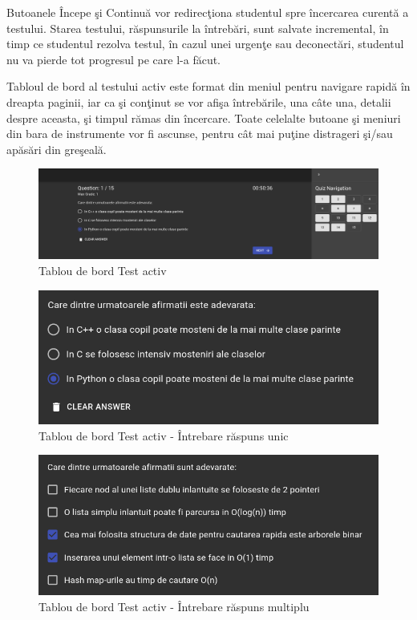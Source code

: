 \documentclass[12pt, a4paper, oneside, romanian]{teza-upb}
\begin{document}
Butoanele Începe şi Continuă vor redirecţiona studentul spre încercarea curentă a testului. Starea testului, răspunsurile la întrebări, sunt salvate incremental, în timp ce studentul rezolva testul, în cazul unei urgenţe sau deconectări, studentul nu va pierde tot progresul pe care l-a făcut.

Tabloul de bord al testului activ este format din meniul pentru navigare rapidă în dreapta paginii, iar ca şi conţinut se vor afişa întrebările, una câte una, detalii despre aceasta, şi timpul rămas din încercare. Toate celelalte butoane şi meniuri din bara de instrumente vor fi ascunse, pentru cât mai puţine distrageri şi/sau apăsări din greşeală.

\begin{figure}[H]
\centering
\includegraphics*[width=\columnwidth]{tablou-de-bord-test-activ}
\caption{Tablou de bord Test activ}
\label{tablou-de-bord-test-activ}
\end{figure}

\begin{figure}[H]
\centering
\includegraphics*[width=0.7\columnwidth]{tablou-de-bord-test-activ-intrebare-raspuns-unic}
\caption{Tablou de bord Test activ - Întrebare răspuns unic}
\label{tablou-de-bord-test-activ-intrebare-raspuns-unic}
\end{figure}

\begin{figure}[H]
\centering
\includegraphics*[width=0.7\columnwidth]{tablou-de-bord-test-activ-intrebare-raspuns-multiplu}
\caption{Tablou de bord Test activ - Întrebare răspuns multiplu}
\label{tablou-de-bord-test-activ-intrebare-raspuns-multiplu}
\end{figure}
\end{document}
